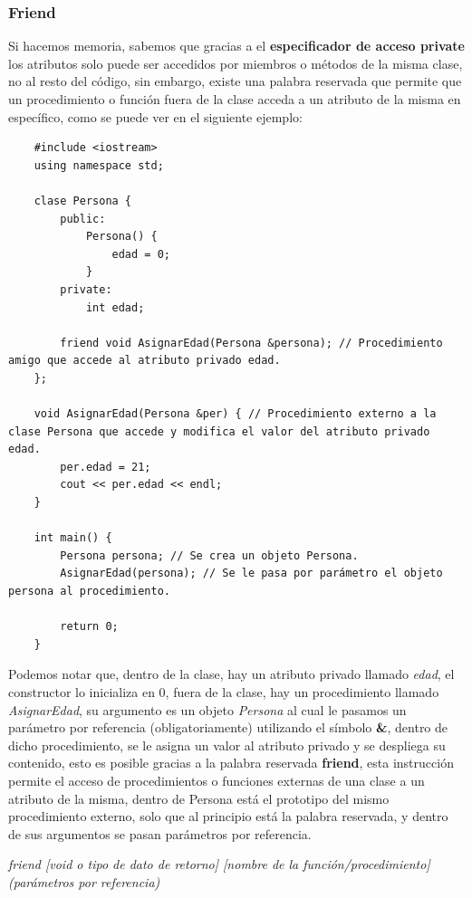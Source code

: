 \subsubsection{Friend}
\hspace{0.55cm}Si hacemos memoria, sabemos que gracias a el \textbf{especificador de acceso private} los atributos solo puede ser accedidos por miembros o métodos de la misma clase, no al resto del código, sin embargo, existe una palabra reservada que permite que un procedimiento o función fuera de la clase acceda a un atributo de la misma en específico, como se puede ver en el siguiente ejemplo:
\begin{lstlisting}
    #include <iostream>
    using namespace std;

    clase Persona {
        public:
            Persona() {
                edad = 0;
            }
        private:
            int edad;
        
        friend void AsignarEdad(Persona &persona); // Procedimiento amigo que accede al atributo privado edad.
    };
    
    void AsignarEdad(Persona &per) { // Procedimiento externo a la clase Persona que accede y modifica el valor del atributo privado edad.
        per.edad = 21;
        cout << per.edad << endl;
    }
    
    int main() {
        Persona persona; // Se crea un objeto Persona.
        AsignarEdad(persona); // Se le pasa por parámetro el objeto persona al procedimiento.
        
        return 0;
    }
\end{lstlisting}

Podemos notar que, dentro de la clase, hay un atributo privado llamado \textit{edad}, el constructor lo inicializa en 0, fuera de la clase, hay un procedimiento llamado \textit{AsignarEdad}, su argumento es un objeto \textit{Persona} al cual le pasamos un parámetro por referencia (obligatoriamente) utilizando el símbolo \textbf{\&}, dentro de dicho procedimiento, se le asigna un valor al atributo privado y se despliega su contenido, esto es posible gracias a la palabra reservada \textbf{friend}, esta instrucción permite el acceso de procedimientos o funciones externas de una clase a un atributo de la misma, dentro de Persona está el prototipo del mismo procedimiento externo, solo que al principio está la palabra reservada, y dentro de sus argumentos se pasan parámetros por referencia.
\begin{center}
	\textit{friend [void o tipo de dato de retorno] [nombre de la función/procedimiento] (parámetros por referencia)}
\end{center}

